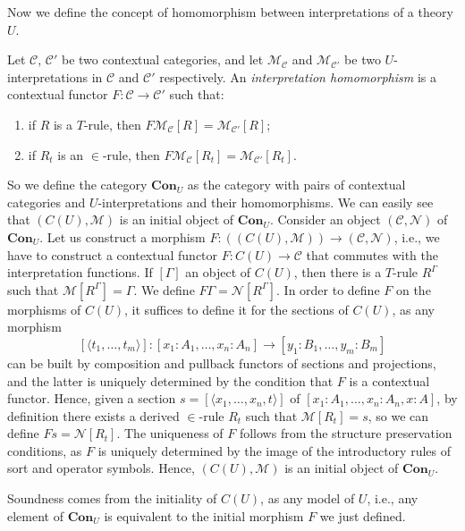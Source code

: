 Now we define the concept of homomorphism between interpretations of a theory $U$.
\begin{definition}
    Let $\mathcal{C}$, $\mathcal{C}'$ be two contextual categories, and let $\mathcal{M_C}$ and $\mathcal{M_{C'}}$
    be two $U$-interpretations in $\mathcal{C}$ and $\mathcal{C}'$ respectively. An \textit{interpretation 
    homomorphism} is a contextual functor $F \colon \mathcal{C} \to \mathcal{C}'$ such that:
    \begin{enumerate}
        \item if $R$ is a $T$-rule, then $F \mathcal{M_C}[R] = \mathcal{M_{C'}}[R]$;
        \item if $R_t$ is an $\in$-rule, then $F \mathcal{M_C}[R_t] = \mathcal{M_{C'}}[R_t]$.
    \end{enumerate}
\end{definition}
So we define the category $\mathbf{Con}_U$ as the category with pairs of contextual categories and $U$-interpretations
and their homomorphisms. We can easily see that $(C(U), \mathcal{M})$ is an
initial object of $\mathbf{Con}_U$. Consider an object $(\mathcal{C}, \mathcal{N})$ of
$\mathbf{Con}_U$. Let us construct a morphism $F \colon ((C(U), \mathcal{M})) \to (\mathcal{C}, \mathcal{N})$, i.e., we have to construct
a contextual functor $F \colon C(U) \to \mathcal{C}$ that commutes with the interpretation functions.
If $[\Gamma]$ an object of $C(U)$, then there is a $T$-rule $R^\Gamma$ such that $\mathcal{M}[R^\Gamma] = \Gamma$. We define 
$F \Gamma = \mathcal{N}[R^\Gamma]$. 
In order to define $F$ on the morphisms of $C(U)$, it suffices to define it for the sections of $C(U)$, as any morphism 
\[
    [\langle t_1, \dots, t_m \rangle] \colon
    [x_1 \colon A_1, \dots, x_n \colon A_n]  \to
    [y_1 \colon B_1, \dots, y_m \colon B_m]
\]
can be built by composition and pullback functors of sections and projections, and the latter is uniquely determined by the condition that $F$
is a contextual functor.
Hence, given a section $s = [\langle x_1, \dots, x_n, t \rangle]$ of $[x_1 \colon A_1, \dots, x_n \colon A_n, x \colon A]$,
by definition there exists a derived $\in$-rule $R_t$ such that $\mathcal{M}[R_t] = s$, so we can define
$F s = \mathcal{N}[R_t]$.
The uniqueness of $F$ follows from the structure preservation conditions, as $F$ is uniquely determined by 
the image of the introductory rules of sort and operator symbols.
Hence, $(C(U), \mathcal{M})$ is an initial object of $\mathbf{Con}_U$.

Soundness comes from the initiality of $C(U)$, as any model of $U$, i.e., any element of $\mathbf{Con}_U$
is equivalent to the initial morphism $F$ we just defined.

